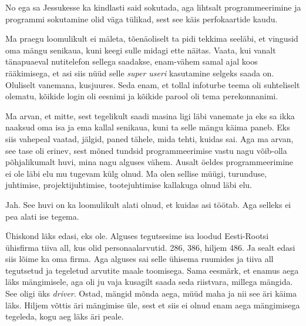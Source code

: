 
No ega sa Jessukesse ka kindlasti said sokutada, aga lihtsalt  programmeerimine ja programmi sokutamine olid väga tülikad, sest see käis perfokaartide kaudu.
                 

Ma praegu loomulikult ei mäleta, tõenäoliselt ta pidi tekkima seeläbi, et vingusid oma mängu senikaua, kuni keegi sulle midagi ette näitas. Vaata, kui vanalt tänapuaeval nutitelefon sellega saadakse, enam-vähem samal ajal koos rääkimisega, et asi siis nüüd selle \emph{super useri} kasutamine selgeks saada on. Oluliselt vanemana, kusjuures. Seda enam, et tollal  infoturbe teema oli suhteliselt olematu,  kõikide login oli eesnimi ja kõikide parool oli tema perekonnanimi.


Ma arvan, et mitte, sest tegelikult saadi masina ligi läbi vanemate ja eks sa ikka naaksud oma isa ja ema kallal senikaua, kuni ta selle mängu käima paneb. Eks siis vahepeal vaatad, jälgid, paned tähele, mida tehti, kuidas sai. Aga ma arvan, see tase oli erinev, sest mõned tundsid programmeerimise vastu nagu võib-olla põhjalikumalt huvi, mina nagu alguses vähem. Ausalt öeldes programmeerimine ei ole läbi elu mu tugevam külg olnud. Ma olen sellise müügi, turunduse, juhtimise, projektijuhtimise, tootejuhtimise kallakuga olnud läbi elu.


Jah. See huvi on ka loomulikult alati olnud, et kuidas asi töötab. Aga selleks ei pea alati ise tegema.
                 

Ühiskond läks edasi, eks ole. Alguses tegutsesime  isa loodud Eesti-Rootsi ühisfirma tiiva all, kus olid personaalarvutid. 286, 386, hiljem 486. Ja sealt edasi siis lõime ka oma firma. Aga alguses sai selle ühisema ruumides ja tiiva all tegutsetud ja tegeletud arvutite maale toomisega. Sama eesmärk, et enamus aega läks mängimisele, aga oli ju vaja kusagilt saada seda riistvara, millega mängida. See oligi üks \emph{driver}. Ostad, mängid mõnda aega, müüd maha ja nii see äri käima läks. Hiljem võttis äri mängimise üle, sest et siis ei olnud enam aega mängimisega tegeleda, kogu aeg läks äri peale. 

